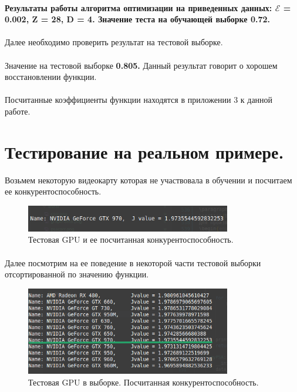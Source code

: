 \documentclass[14pt, a4paper]{extarticle}
\begin{document}
\paragraph{}
\textbf{Результаты работы алгоритма оптимизации на приведенных данных: \(\mathcal{E}\) = 0.002, Z = 28, D = 4. Значение теста на обучающей выборке 0.72.}
\paragraph{}
Далее необходимо проверить результат на тестовой выборке.
\paragraph{}
Значение на тестовой выборке \textbf{0.805.} Данный результат говорит о хорошем восстановлении функции.

\paragraph{}
Посчитанные коэффициенты функции находятся в приложении 3 к данной работе.
\paragraph{}
\section{Тестирование на реальном примере.}
Возьмем некоторую видеокарту которая не участвовала в обучении и посчитаем ее конкурентоспособность.
\begin{figure}[h]
    \centering
    \includegraphics[width=0.8\textwidth]{./img/linear/test_gpu.png}
    \caption{Тестовая GPU и ее посчитанная конкурентоспособность.}
    \label{fig:example}
  \end{figure}
\paragraph{}
Далее посмотрим на ее поведение в некоторой части тестовой выборки отсортированной по значению функции.
\begin{figure}[h]
    \centering
    \includegraphics[width=0.8\textwidth]{./img/linear/test_calc.png}
    \caption{Тестовая GPU в выборке. Посчитанная конкурентоспособность.}
    \label{fig:example}
  \end{figure}
\end{document}

